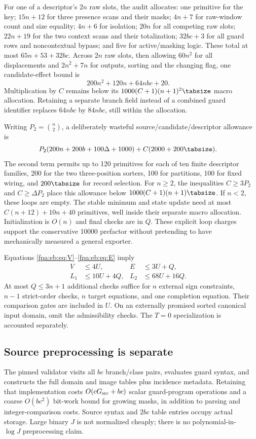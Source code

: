 \documentclass[11pt,a4paper]{article}
\numberwithin{equation}{section}
\begin{document}
For one of a descriptor's $2n$ raw slots, the audit allocates: one primitive for the key; $15n+12$ for three presence scans and their masks; $4n+7$ for raw-window count and size equality; $4n+6$ for isolation; $20n$ for all competing raw slots; $22n+19$ for the two context scans and their totalization; $32bc+3$ for all guard rows and noncontextual bypass; and five for active/masking logic. These total at most $65n+53+32bc$. Across $2n$ raw slots, then allowing $60n^2$ for all displacements and $2n^2+7n$ for outputs, sorting and the changing flag, one candidate-effect bound is
\[
200n^2+120n+64nbc+20.
\]
Multiplication by $C$ remains below its $1000(C+1)(n+1)^2\tabsize$ macro allocation. Retaining a separate branch field instead of a combined guard identifier replaces $64nbc$ by $84nbc$, still within the allocation.

Writing $P_2=\binom n2$, a deliberately wasteful source/candidate/descriptor allowance is
\[
P_2(200n+200b+100\Delta+1000)+C(2000+200\tabsize).
\]
The second term permits up to 120 primitives for each of ten finite descriptor families, 200 for the two three-position sorters, 100 for partitions, 100 for fixed wiring, and $200\tabsize$ for record selection. For $n\geq2$, the inequalities $C\geq3P_2$ and $C\geq\Delta P_2$ place this allowance below $1000(C+1)(n+1)\tabsize$. If $n<2$, these loops are empty. The stable minimum and state update need at most $C(n+12)+10n+40$ primitives, well inside their separate macro allocation. Initialization is $O(n)$ and final checks are in $Q$. These explicit loop charges support the conservative 10000 prefactor without pretending to have mechanically measured a general exporter.

Equations \eqref{fpa:eb:eq:V}--\eqref{fpa:eb:eq:E} imply
\begin{align*}
V&\leq4U,& E&\leq3U+Q,\\
L_1&\leq10U+4Q,&L_2&\leq68U+16Q.
\end{align*}
At most $Q\leq3n+1$ additional checks suffice for $n$ external sign constraints, $n-1$ strict-order checks, $n$ target equations, and one completion equation. Their comparison gates are included in $U$. On an externally promised sorted canonical input domain, omit the admissibility checks. The $T=0$ specialization is accounted separately.

\subsection{Source preprocessing is separate}
The pinned validator visits all $bc$ branch/class pairs, evaluates guard syntax, and constructs the full domain and image tables plus incidence metadata. Retaining that implementation costs $O(cG_{\rm src}+bc)$ scalar guard-program operations and a coarse $O(bc^2)$ bit-work bound for growing masks, in addition to parsing and integer-comparison costs. Source syntax and $2bc$ table entries occupy actual storage. Large binary $J$ is not normalized cheaply; there is no polynomial-in-$\log J$ preprocessing claim.
\end{document}
